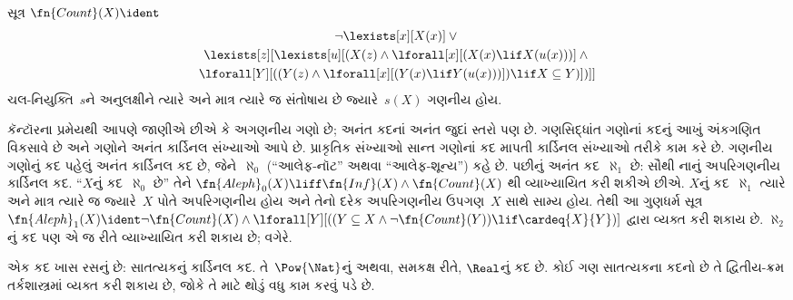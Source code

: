 \begin{prop}
સૂત્ર $\fn{Count}(X) \ident $
\begin{multline*}
\lnot \lexists[x][X(x)] \lor {} \\
\lexists[z][\lexists[u][(X(z) \land
    \lforall[x][(X(x) \lif X(u(x)))] \land {} \\ \lforall[Y][((Y(z) \land
      \lforall[x][(Y(x) \lif Y(u(x)))]) \lif X \subseteq Y)])]]
\end{multline*}
ચલ-નિયુક્તિ~$s$ને અનુલક્ષીને ત્યારે અને માત્ર ત્યારે જ સંતોષાય છે
જ્યારે~$s(X)$ ગણનીય હોય.
\end{prop}

કૅન્ટૉરના પ્રમેયથી આપણે જાણીએ છીએ કે અગણનીય ગણો છે;
અનંત કદનાં અનંત જુદાં સ્તરો પણ છે. ગણસિદ્ધાંત ગણોનાં કદનું આખું
અંકગણિત વિકસાવે છે અને ગણોને અનંત કાર્ડિનલ સંખ્યાઓ આપે છે. પ્રાકૃતિક
સંખ્યાઓ સાન્ત ગણોનાં કદ માપતી કાર્ડિનલ સંખ્યાઓ તરીકે કામ કરે છે.
ગણનીય ગણોનું કદ પહેલું અનંત કાર્ડિનલ કદ છે, જેને~$\aleph_0$
(``આલેફ-નૉટ'' અથવા ``આલેફ-શૂન્ય'') કહે છે. પછીનું અનંત કદ~$\aleph_1$
છે: સૌથી નાનું અપરિગણનીય કાર્ડિનલ કદ. ``$X$નું કદ~$\aleph_0$ છે''
તેને $\fn{Aleph}_0(X) \liff \fn{Inf}(X) \land \fn{Count}(X)$
થી વ્યાખ્યાયિત કરી શકીએ છીએ. $X$નું કદ~$\aleph_1$ ત્યારે અને માત્ર
ત્યારે જ જ્યારે~$X$ પોતે અપરિગણનીય હોય અને તેનો દરેક અપરિગણનીય
ઉપગણ~$X$ સાથે સામ્ય હોય. તેથી આ ગુણધર્મ સૂત્ર
$\fn{Aleph}_1(X) \ident \lnot\fn{Count}(X) \land
\lforall[Y][((Y \subseteq X \land \lnot\fn{Count}(Y))
  \lif \cardeq{X}{Y})]$ દ્વારા વ્યક્ત કરી શકાય છે. $\aleph_2$નું
કદ પણ એ જ રીતે વ્યાખ્યાયિત કરી શકાય છે; વગેરે.

એક કદ ખાસ રસનું છે: સાતત્યકનું કાર્ડિનલ કદ. તે~$\Pow{\Nat}$નું
અથવા, સમકક્ષ રીતે, $\Real$નું કદ છે. કોઈ ગણ સાતત્યકના કદનો છે
તે દ્વિતીય-ક્રમ તર્કશાસ્ત્રમાં વ્યક્ત કરી શકાય છે, જોકે તે માટે
થોડું વધુ કામ કરવું પડે છે.
\endgroup


